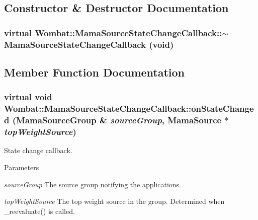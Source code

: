 \subsection{Constructor \& Destructor Documentation}
\hypertarget{classWombat_1_1MamaSourceStateChangeCallback_a47631526146f256086453731e24306c0}{
\subsubsection[{$\sim$MamaSourceStateChangeCallback}]{\setlength{\rightskip}{0pt plus 5cm}virtual Wombat::MamaSourceStateChangeCallback::$\sim$MamaSourceStateChangeCallback (void)}}
\label{classWombat_1_1MamaSourceStateChangeCallback_a47631526146f256086453731e24306c0}


\subsection{Member Function Documentation}
\hypertarget{classWombat_1_1MamaSourceStateChangeCallback_aebc13e83b3de1072ef12a6083bc5061b}{
\subsubsection[{onStateChanged}]{\setlength{\rightskip}{0pt plus 5cm}virtual void Wombat::MamaSourceStateChangeCallback::onStateChanged ({\bf MamaSourceGroup} \& {\em sourceGroup}, \/  {\bf MamaSource} $\ast$ {\em topWeightSource})}}
\label{classWombat_1_1MamaSourceStateChangeCallback_aebc13e83b3de1072ef12a6083bc5061b}


State change callback. 
\begin{DoxyParams}{Parameters}
\item[{\em sourceGroup}]The source group notifying the applications. \item[{\em topWeightSource}]The top weight source in the group. Determined when \_\-reevaluate() is called. \end{DoxyParams}
